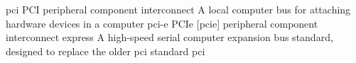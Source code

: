 \newglsXacronym%
{pci}%
{PCI}%
{peripheral component interconnect}%
{A local computer bus for attaching hardware devices in a computer}%
\newglsXacronym%
{pci-e}%
{PCIe}%
[pcie]%
{peripheral component interconnect express}%
{A high-speed serial computer expansion bus standard, designed to replace the older \gls{pci} standard}%
{pci}%